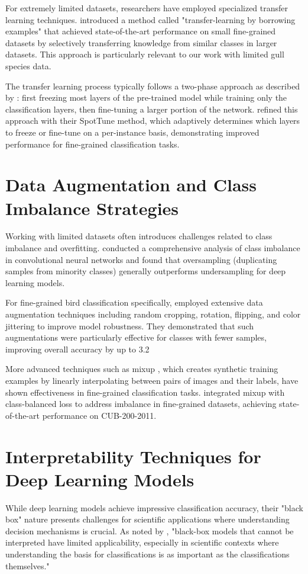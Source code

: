 \documentclass[a4paper,12pt]{article}
\begin{document}
For extremely limited datasets, researchers have employed specialized transfer learning techniques. \citep{cui2018large} introduced a method called "transfer-learning by borrowing examples" that achieved state-of-the-art performance on small fine-grained datasets by selectively transferring knowledge from similar classes in larger datasets. This approach is particularly relevant to our work with limited gull species data.

The transfer learning process typically follows a two-phase approach as described by \citep{sharif2014cnn}: first freezing most layers of the pre-trained model while training only the classification layers, then fine-tuning a larger portion of the network. \citep{guo2019spottune} refined this approach with their SpotTune method, which adaptively determines which layers to freeze or fine-tune on a per-instance basis, demonstrating improved performance for fine-grained classification tasks.

\section*{Data Augmentation and Class Imbalance Strategies}
Working with limited datasets often introduces challenges related to class imbalance and overfitting. \citep{buda2018systematic} conducted a comprehensive analysis of class imbalance in convolutional neural networks and found that oversampling (duplicating samples from minority classes) generally outperforms undersampling for deep learning models.

For fine-grained bird classification specifically, \citep{chu2020fine} employed extensive data augmentation techniques including random cropping, rotation, flipping, and color jittering to improve model robustness. They demonstrated that such augmentations were particularly effective for classes with fewer samples, improving overall accuracy by up to 3.2%

More advanced techniques such as mixup \citep{zhang2018mixup}, which creates synthetic training examples by linearly interpolating between pairs of images and their labels, have shown effectiveness in fine-grained classification tasks. \citep{cui2019class} integrated mixup with class-balanced loss to address imbalance in fine-grained datasets, achieving state-of-the-art performance on CUB-200-2011.

\section*{Interpretability Techniques for Deep Learning Models}
While deep learning models achieve impressive classification accuracy, their "black box" nature presents challenges for scientific applications where understanding decision mechanisms is crucial. As noted by \citep{montavon2018methods}, "black-box models that cannot be interpreted have limited applicability, especially in scientific contexts where understanding the basis for classifications is as important as the classifications themselves."
\end{document}
